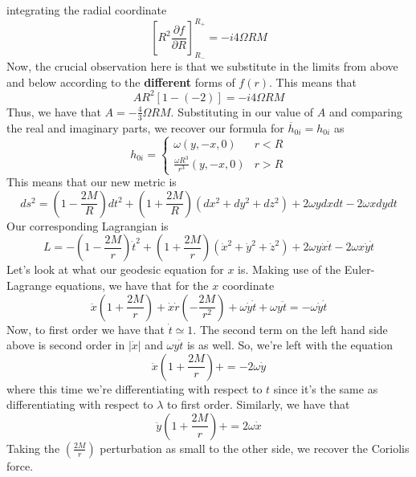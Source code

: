 \documentclass[11pt, a4paper]{article}   	%
\theoremstyle{slplain}
\begin{document}
integrating the radial coordinate 
\[
\left[  R ^ 2 \frac{\partial  f }{\partial  R }   \right] ^{ R _ + }_{ R_{ - } }  =  - i 4 \Omega R M 
\] Now, the crucial observation 
here is that we substitute in the limits from 
above and below according to the \textbf{different} forms 
of $ f \left( r  \right)  $. This means that 
\[
A R ^ 2 \left[  1 - \left(  - 2 \right)   \right]  = - i 4 \Omega R M 
\]  Thus, we have that 
$ A =  - \frac{4}{3 }  \Omega R M $.
Substituting in our value of $ A $ and comparing the real and imaginary parts, we recover
our formula for $ \overline{ h }_{ 0i  }  = h _{ 0i } $   
as 
\[
h_{ 0i }  = \begin{cases}
\omega  \left(  y , -x, 0  \right)  & r < R \\
\frac{\omega  R ^ 3 }{ r ^ 3 }  \left( y , -x , 0  \right)  & r > R 
\end{cases}
\] 
This means that our new metric is 
\[
ds ^ 2  = \left(  1 - \frac{2M}{ R }  \right)  dt ^ 2 + \left(  1 + \frac{2M}{ R }  \right)  
\left( dx ^ 2 + dy ^ 2 + dz ^ 2  \right)  + 2 \omega  y dx dt - 2 \omega x dy dt 
\] Our corresponding Lagrangian is 
\[
L =  - \left(  1 - \frac{2M}{r }  \right) \dot{  t } ^ 2 +  \left(  1 + \frac{2M}{r }  \right) 
\left( \dot{ x } ^ 2 + \dot{ y } ^ 2 + \dot{ z } ^ 2     \right)  + 
2 \omega y \dot{ x } \dot{ t } - 2 \omega x \dot{ y } \dot{ t }     
\] Let's look at what our geodesic equation for 
$ x $ is. Making use of the Euler-Lagrange equations, 
we have that for the $ x $ coordinate 
\[
\ddot{x} \left(  1  +\frac{2M}{ r }  \right)  + \dot{ x } \dot{ r } (  - \frac{2M}{r ^ 2 } ) + 
\omega  \dot{ y } \dot{ t } + \omega y \ddot{t}  = -  \omega \dot{ y } \dot{ t }    
\]  Now, to first order we have that $ \dot{ t } \simeq 1  $. The second term 
on the left hand side above is second order in $ | \dot{ x } |   $ and $ \omega y  \ddot{ t  }$ 
is as well. 
So, we're left with the equation 
\[
\ddot{x} (  1 + \frac{2M}{r } ) +  =  - 2 \omega \dot{ y }   
\]  where this time we're differentiating with respect to $ t $ 
since it's the same as differentiating 
with respect to $ \lambda $ to first order. 
Similarly, we have that \[ 
\ddot{y} (  1 + \frac{2M}{r } ) +  =  2 \omega \dot{ x}   
\] Taking the $ \left( \frac{2M}{ r }  \right)  $ perturbation as 
small to the other side, we recover the Coriolis force.

\pagebreak
\end{document}
